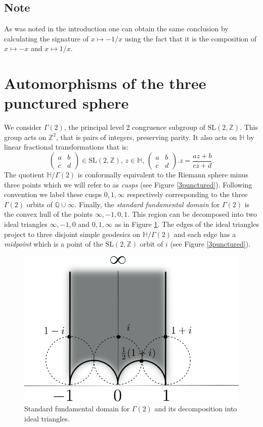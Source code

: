 \documentclass[12pt,a4paper]{amsart}
\def\HH{\mathbb{H}}
\def\xx{\HH/g2}
\def\ZZ{\mathbb{Z}}
\def\QQ{\mathbb{Q}}
\def\sl2{\mathrm{SL}(2, \ZZ)}
\def\g2{\Gamma(2)}
\def\xx{\HH/\g2}
\begin{document}
\subsection*{Note}
As was noted in the introduction one can obtain the same conclusion 
by calculating the signature of $x\mapsto -1/x$ 
using the fact that it is  the composition of
$x \mapsto -x$ and $x \mapsto 1/x$.


\section{Automorphisms of the three punctured sphere}


We consider $\g2$,
the principal level 2 congruence subgroup of $\sl2$.
This group acts on $\ZZ^2$, that is pairs of integers,  preserving parity.
It also acts on $\HH$ by linear fractional transformations
that is:
$$\begin{pmatrix}
a & b \\
c & d
\end{pmatrix} \in \sl2,\, z\in \HH,\, 
\begin{pmatrix}
a & b \\
c & d
\end{pmatrix}. z = \frac{az + b}{cz + d}.
$$
The quotient $\xx$ is conformally equivalent to the Riemann  sphere minus three points
which we will refer to as \textit{cusps}
(see Figure \ref{3punctured}). 
Following  convention we label these cusps $0,1,\infty$ respectively
corresponding to the three $\g2$ orbits of $\QQ \cup \infty$. 
Finally, the \textit{standard fundamental domain}  for $\g2$ 
is the convex hull of the points $\infty, -1, 0 , 1$.
This region can be decomposed into two ideal triangles 
$\infty, -1, 0 $ and $ 0 , 1,\infty$ as in Figure \ref{fund}.
The edges of the ideal triangles project to three disjoint simple geodesics on $\xx$
and each edge has a \textit{midpoint} 
which is a point of the $\sl2$ orbit of $i$ (see Figure \ref{3punctured}).

 \begin{figure}[hb]
\begin{center}
\includegraphics[scale=.5]{fund_dom.png} 
\end{center}
\caption{Standard fundamental domain for $\g2$ and its decomposition into ideal triangles.}
\label{fund}
\end{figure}
\end{document}
